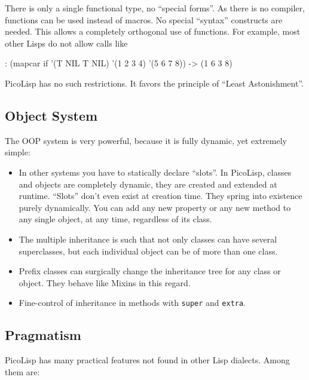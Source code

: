 There is only a single functional type, no ``special forms''. As there is
no compiler, functions can be used instead of macros. No special
``syntax'' constructs are needed. This allows a completely orthogonal use
of functions. For example, most other Lisps do not allow calls like


\begin{wideverbatim}
: (mapcar if '(T NIL T NIL) '(1 2 3 4) '(5 6 7 8))
-> (1 6 3 8)
\end{wideverbatim}

PicoLisp has no such restrictions. It favors the principle of ``Least
Astonishment''.
\subsection{Object System}
\label{sec:faq-object-system}


The OOP system is very powerful, because it is fully dynamic, yet
extremely simple:

\begin{itemize}
\item In other systems you have to statically declare ``slots''. In PicoLisp,
   classes and objects are completely dynamic, they are created and
   extended at runtime. ``Slots'' don't even exist at creation time. They
   spring into existence purely dynamically. You can add any new
   property or any new method to any single object, at any time,
   regardless of its class.
\item The multiple inheritance is such that not only classes can have
   several superclasses, but each individual object can be of more than
   one class.
\item Prefix classes can surgically change the inheritance tree for any
   class or object. They behave like Mixins in this regard.
\item Fine-control of inheritance in methods with \texttt{super} and \texttt{extra}.
\end{itemize}
\subsection{Pragmatism}
\label{sec:faq-pragmatism}


PicoLisp has many practical features not found in other Lisp dialects.
Among them are:

